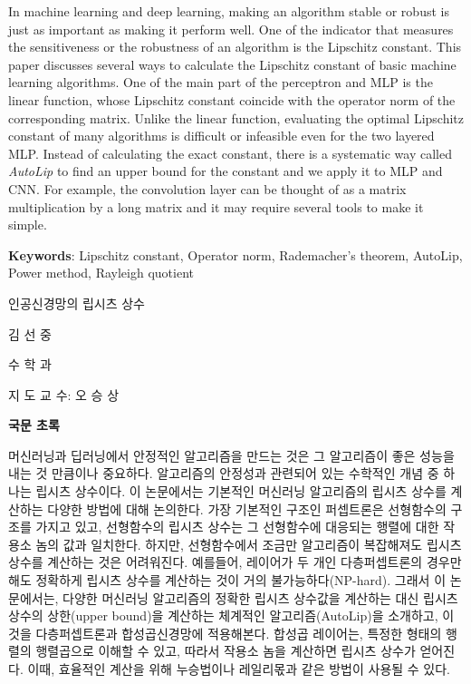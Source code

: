 \documentclass[11pt]{report}
\begin{document}
\normalsize
\justifying %
\doublespacing

In machine learning and deep learning, making an algorithm stable or robust is just as important as making it perform well.
One of the indicator that measures the sensitiveness or the robustness of an algorithm is the Lipschitz constant.
This paper discusses several ways to calculate the Lipschitz constant of basic machine learning algorithms.
One of the  main part of the perceptron and MLP is the linear function, whose Lipschitz constant coincide with the operator norm of the corresponding matrix.
Unlike the linear function, evaluating the optimal Lipschitz constant of many algorithms is difficult or infeasible even for the two layered MLP.
Instead of calculating the exact constant, there is a systematic way called \emph{AutoLip} to find an upper bound for the constant and we apply it to MLP and CNN.
For example, the convolution layer can be thought of as a matrix multiplication by a long matrix and it may require several tools to make it simple.

\par\vspace{20pt}
\textbf{Keywords}: Lipschitz constant, Operator norm, Rademacher's theorem, AutoLip, Power method, Rayleigh quotient


\newpage 
\begin{center}
\LARGE 인공신경망의 립시츠 상수 %
\par\vspace{20pt}
\normalsize 김 선 중\par %
수 학 과\par %
지 도 교 수:  오 승 상
\par\vspace{20pt}
\large \textbf{국문 초록}
\end{center}

\normalsize 

머신러닝과 딥러닝에서 안정적인 알고리즘을 만드는 것은 그 알고리즘이 좋은 성능을 내는 것 만큼이나 중요하다.
알고리즘의 안정성과 관련되어 있는 수학적인 개념 중 하나는 립시츠 상수이다.
이 논문에서는 기본적인 머신러닝 알고리즘의 립시츠 상수를 계산하는 다양한 방법에 대해 논의한다.
가장 기본적인 구조인 퍼셉트론은 선형함수의 구조를 가지고 있고, 선형함수의 립시츠 상수는 그 선형함수에 대응되는 행렬에 대한 작용소 놈의 값과 일치한다.
하지만, 선형함수에서 조금만 알고리즘이 복잡해져도 립시츠 상수를 계산하는 것은 어려워진다.
예를들어, 레이어가 두 개인 다층퍼셉트론의 경우만 해도 정확하게 립시츠 상수를 계산하는 것이 거의 불가능하다(NP-hard).
그래서 이 논문에서는, 다양한 머신러닝 알고리즘의 정확한 립시츠 상수값을 계산하는 대신 립시츠 상수의 상한(upper bound)을 계산하는 체계적인 알고리즘(AutoLip)을 소개하고, 이것을 다층퍼셉트론과 합성곱신경망에 적용해본다.
합성곱 레이어는, 특정한 형태의 행렬의 행렬곱으로 이해할 수 있고, 따라서 작용소 놈을 계산하면 립시츠 상수가 얻어진다.
이때, 효율적인 계산을 위해 누승법이나 레일리몫과 같은 방법이 사용될 수 있다.
\end{document}
